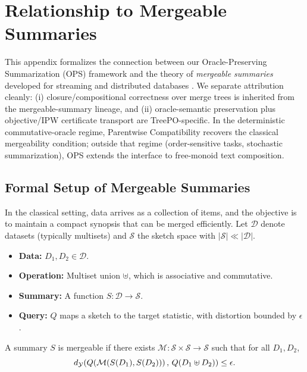 \section{Relationship to Mergeable Summaries}\label{app:mergeable}

This appendix formalizes the connection between our Oracle-Preserving Summarization (OPS) framework and the theory of \emph{mergeable summaries} developed for streaming and distributed databases \citep{Agarwal2013MergeableTODS}. We separate attribution cleanly: (i) closure/compositional correctness over merge trees is inherited from the mergeable-summary lineage, and (ii) oracle-semantic preservation plus objective/IPW certificate transport are TreePO-specific. In the deterministic commutative-oracle regime, Parentwise Compatibility recovers the classical mergeability condition; outside that regime (order-sensitive tasks, stochastic summarization), OPS extends the interface to free-monoid text composition.

\subsection{Formal Setup of Mergeable Summaries}

In the classical setting, data arrives as a collection of items, and the objective is to maintain a compact synopsis that can be merged efficiently. Let $\mathcal{D}$ denote datasets (typically multisets) and $\mathcal{S}$ the sketch space with $|\mathcal{S}|\ll|\mathcal{D}|$.
\begin{itemize}
    \item \textbf{Data:} $D_1, D_2 \in \mathcal{D}$.
    \item \textbf{Operation:} Multiset union $\uplus$, which is associative and commutative.
    \item \textbf{Summary:} A function $S:\mathcal{D}\to\mathcal{S}$.
    \item \textbf{Query:} $Q$ maps a sketch to the target statistic, with distortion bounded by $\epsilon$.
\end{itemize}

\begin{definition}
A summary $S$ is mergeable if there exists $\mathcal{M}:\mathcal{S}\times\mathcal{S}\to\mathcal{S}$ such that for all $D_1,D_2$,
\[
    d_{\mathcal{Y}}\!\left(Q\!\left(\mathcal{M}(S(D_1),S(D_2))\right),\, Q(D_1\uplus D_2)\right) \le \epsilon.
\]
\end{definition}

